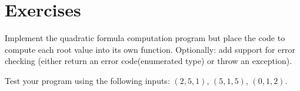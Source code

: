 

\section{Exercises}

\begin{exer}
Implement the quadratic formula computation program but place the code to compute each 
root value into its own function.  Optionally: add support for error checking (either return an error code(enumerated type)
or throw an exception).

Test your program using the following inputs: $(2, 5, 1)$, $(5, 1, 5)$, $(0, 1, 2)$.
\end{exer}


